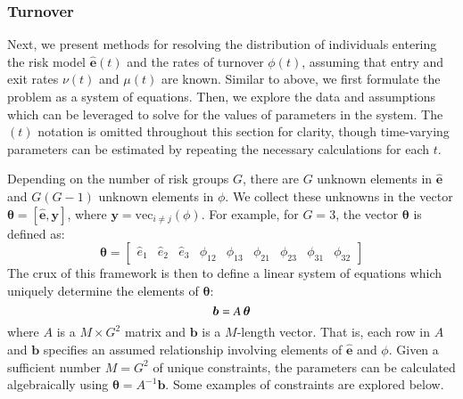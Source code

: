 \subsubsection{Turnover}\label{sss:params-turnover}
Next, we present methods for resolving
the distribution of individuals entering the risk model $\bm{\hat{e}}(t)$ and
the rates of turnover $\phi(t)$,
assuming that entry and exit rates $\nu(t)$ and $\mu(t)$ are known.
Similar to above, we first formulate the problem as a system of equations.
Then, we explore the data and assumptions which can be leveraged
to solve for the values of parameters in the system.
The $(t)$ notation is omitted throughout this section for clarity,
though time-varying parameters can be estimated by
repeating the necessary calculations for each $t$.
\par
Depending on the number of risk groups $G$,
there are $G$ unknown elements in $\bm{\hat{e}}$ and $G(G-1)$ unknown elements in $\phi$.
We collect these unknowns in the vector
$\bm{\theta} = \left[\bm{\hat{e}}, \bm{y}\right]$,
where $\bm{y} = \mathrm{vec}_{i \ne j}(\phi)$.
For example, for $G = 3$, the vector $\bm{\theta}$ is defined as:
\begin{equation}
\bm{\theta} = \left[
\begin{array}{ccccccccc}
\hat{e}_1 & \hat{e}_2 & \hat{e}_3 & \phi_{12} & \phi_{13} & \phi_{21} & \phi_{23} & \phi_{31} & \phi_{32}
\end{array}\right]
\end{equation}
The crux of this framework is then to define a linear system of equations
which uniquely determine the elements of $\bm{\theta}$:
\begin{equation}\label{eq:system-matrix}
\bm{b} = A \thinspace \bm{\theta}
\end{equation}  
where $A$ is a $M \times G^2 $ matrix
and $\bm{b}$ is a $M$-length vector.
That is, each row in $A$ and $\bm{b}$ specifies
an assumed relationship involving elements of
$\bm{\hat{e}}$ and $\phi$.
Given a sufficient number $M = G^2$ of unique constraints,
the parameters can be calculated algebraically using $\bm{\theta} = A^{-1}\bm{b}$.
Some examples of constraints are explored below.
